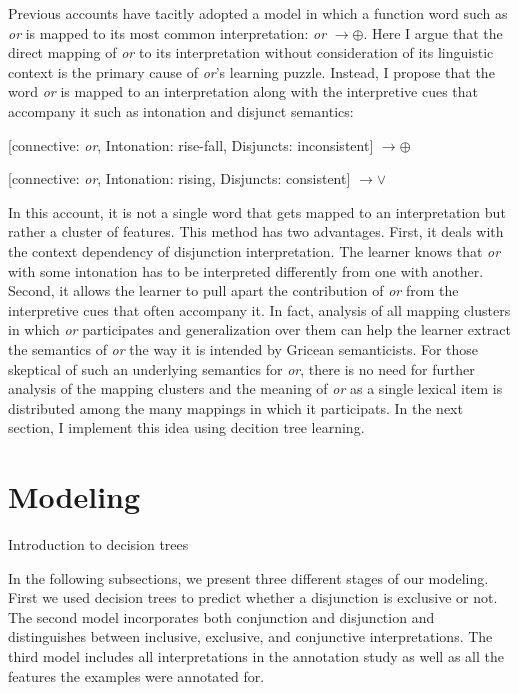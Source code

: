 \documentclass[oneside]{report}
\theoremstyle{definition}
\theoremstyle{definition}
\theoremstyle{definition}
\theoremstyle{remark}
\begin{document}
Previous accounts have tacitly adopted a model in which a function word
such as \emph{or} is mapped to its most common interpretation: \emph{or}
\(\rightarrow \oplus\). Here I argue that the direct mapping of
\emph{or} to its interpretation without consideration of its linguistic
context is the primary cause of \emph{or}'s learning puzzle. Instead, I
propose that the word \emph{or} is mapped to an interpretation along
with the interpretive cues that accompany it such as intonation and
disjunct semantics:

{[}connective: \emph{or}, Intonation: rise-fall, Disjuncts:
inconsistent{]} \(\rightarrow \oplus\)

{[}connective: \emph{or}, Intonation: rising, Disjuncts: consistent{]}
\(\rightarrow \lor\)

In this account, it is not a single word that gets mapped to an
interpretation but rather a cluster of features. This method has two
advantages. First, it deals with the context dependency of disjunction
interpretation. The learner knows that \emph{or} with some intonation
has to be interpreted differently from one with another. Second, it
allows the learner to pull apart the contribution of \emph{or} from the
interpretive cues that often accompany it. In fact, analysis of all
mapping clusters in which \emph{or} participates and generalization over
them can help the learner extract the semantics of \emph{or} the way it
is intended by Gricean semanticists. For those skeptical of such an
underlying semantics for \emph{or}, there is no need for further
analysis of the mapping clusters and the meaning of \emph{or} as a
single lexical item is distributed among the many mappings in which it
participats. In the next section, I implement this idea using decition
tree learning.

\section{Modeling}\label{modeling}

Introduction to decision trees

In the following subsections, we present three different stages of our
modeling. First we used decision trees to predict whether a disjunction
is exclusive or not. The second model incorporates both conjunction and
disjunction and distinguishes between inclusive, exclusive, and
conjunctive interpretations. The third model includes all
interpretations in the annotation study as well as all the features the
examples were annotated for.
\end{document}
